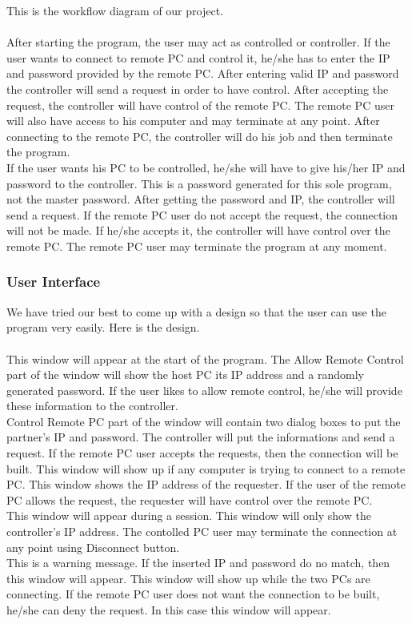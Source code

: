 \documentclass{article}
\begin{document}
This is the workflow diagram of our project.\\ \\
After starting the program, the user may act as controlled or controller. If the user wants to connect to remote PC and control it, he/she has to enter the IP and password provided by the remote PC. After entering valid IP and password the controller will send a request in order to have control. After accepting the request, the controller will have control of the remote PC. The remote PC user will also have access to his computer and may terminate at any point. After connecting to the remote PC, the controller will do his job and then terminate the program. \\
If the user wants his PC to be controlled, he/she will have to give his/her IP and password to the controller. This is a password generated for this sole program, not the master password. After getting the password and IP, the controller will send a request. If the remote PC user do not accept the request, the connection will not be made. If he/she accepts it, the controller will have control over the remote PC. The remote PC user may terminate the program at any moment.\\

\subsubsection{User Interface}

We have tried our best to come up with a design so that the user can use the program very easily. Here is the design.\\ \\ 
This window will appear at the start of the program. The Allow Remote Control part of the window will show the host PC its IP address and a randomly generated password. If the user likes to allow remote control, he/she will provide these information to the controller. \\
Control Remote PC part of the window will contain two dialog boxes to put the partner's IP and password. The controller will put the informations and send a request. If the remote PC user accepts the requests, then the connection will be built. 
This window will show up if any computer is trying to connect to a remote PC. This window shows the IP address of the requester. If the user of the remote PC allows the request, the requester will have control over the remote PC. \\
This window will appear during a session. This window will only show the controller's IP address. The contolled PC user may terminate the connection at any point using Disconnect button. \\
This is a warning message. If the inserted IP and password do no match, then this window will appear.
This window will show up while the two PCs are connecting.
If the remote PC user does not want the connection to be built, he/she can deny the request. In this case this window will appear.
\end{document}

